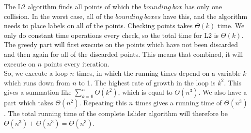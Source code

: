 \documentclass[crop=false,a4paper,oneside,11pt]{article}
\begin{document}
The L2 algorithm finds all points of which the $bounding \ box$ has only one collision. In the worst case, all of the $bounding \ boxes$ have this, and the algorithm needs to place labels on all of the points. Checking points takes $\Theta(k)$ time. We only do constant time operations every check, so the total time for L2 is $\Theta(k)$. \\
The greedy part will first execute on the points which have not been discarded and then again for all of the discarded points. This means that combined, it will execute on $n$ points every iteration.  
\\
So, we execute a loop $n$ times, in which the running times depend on a variable $k$ which runs down from $n$ to 1. The highest rate of growth in the loop is $k^2$. This gives a summation like $\sum_{k=0}^n \Theta(k^2)$, which is equal to $\Theta(n^3)$. We also have a part which takes $\Theta(n^2)$. Repeating this $n$ times gives a running time of $\Theta(n^3)$.
The total running time of the complete 1slider algorithm will therefore be $\Theta(n^3) + \Theta(n^3) = \Theta(n^3)$.
\end{document}
